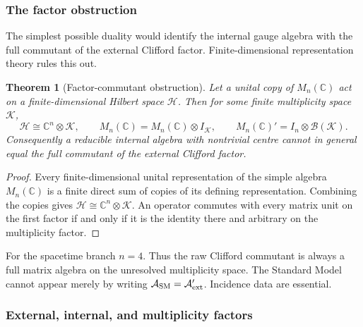 \documentclass[11pt]{article}
\newtheorem{theorem}{Theorem}[section]
\theoremstyle{definition}
\theoremstyle{remark}
\newcommand{\C}{\mathbb C}
\newcommand{\A}{\mathcal A}
\newcommand{\Hh}{\mathcal H}
\begin{document}
\subsubsection{The factor obstruction}

The simplest possible duality would identify the internal gauge algebra with
the full commutant of the external Clifford factor.  Finite-dimensional
representation theory rules this out.

\begin{theorem}[Factor-commutant obstruction]
\label{thm:factor-obstruction}
Let a unital copy of $M_n(\C)$ act on a finite-dimensional Hilbert space
$\Hh$.  Then for some finite multiplicity space $\mathcal K$,
\begin{equation}
\Hh\cong\C^n\otimes\mathcal K,
\qquad
M_n(\C)=M_n(\C)\otimes I_{\mathcal K},
\qquad
M_n(\C)'=I_n\otimes\mathcal B(\mathcal K).
\label{eq:factor-commutant}
\end{equation}
Consequently a reducible internal algebra with nontrivial centre cannot in
general equal the full commutant of the external Clifford factor.
\end{theorem}

\begin{proof}
Every finite-dimensional unital representation of the simple algebra
$M_n(\C)$ is a finite direct sum of copies of its defining representation.
Combining the copies gives $\Hh\cong\C^n\otimes\mathcal K$.  An operator
commutes with every matrix unit on the first factor if and only if it is the
identity there and arbitrary on the multiplicity factor.
\end{proof}

For the spacetime branch $n=4$.  Thus the raw Clifford commutant is always a
full matrix algebra on the unresolved multiplicity space.  The Standard Model
cannot appear merely by writing
$\A_{\rm SM}=\A_{\rm ext}'$.  Incidence data are essential.

\subsubsection{External, internal, and multiplicity factors}
\end{document}
